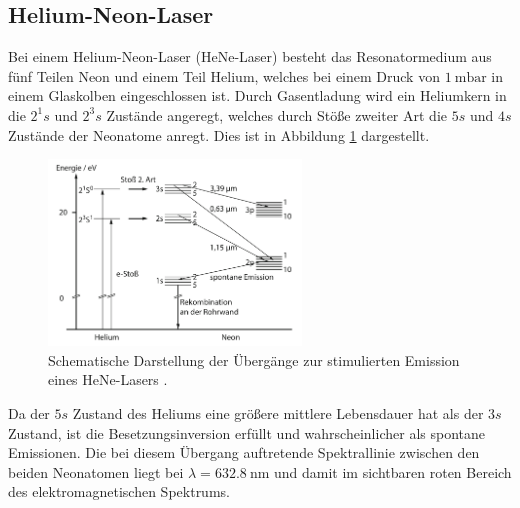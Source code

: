 \subsection{Helium-Neon-Laser}
\label{sec:Helium-Neon-Laser}
Bei einem Helium-Neon-Laser (HeNe-Laser)
besteht das Resonatormedium aus fünf Teilen Neon und einem Teil Helium, welches
bei einem Druck von $\SI{1}{\milli\bar}$ in einem Glaskolben eingeschlossen ist.
Durch Gasentladung wird ein Heliumkern in die $2^1s$ und $2^3s$ Zustände angeregt,
welches durch Stöße zweiter Art die $5s$ und $4s$ Zustände der Neonatome anregt.
Dies ist in Abbildung \ref{fig:HeNe} dargestellt.
\begin{figure}
  \centering
  \includegraphics[width=0.6\textwidth]{content/HeNe.pdf}
  \caption{Schematische Darstellung der Übergänge zur stimulierten
  Emission eines HeNe-Lasers \cite[68]{eichler}.}
  \label{fig:HeNe}
\end{figure}

Da der $5s$ Zustand des Heliums eine größere mittlere Lebensdauer hat als der
$3s$ Zustand, ist die Besetzungsinversion erfüllt und wahrscheinlicher als
spontane Emissionen. Die bei diesem Übergang auftretende Spektrallinie zwischen
den beiden Neonatomen liegt bei $\lambda = \SI{632.8}{\nano\metre}$ und damit
im sichtbaren roten Bereich des elektromagnetischen Spektrums.
